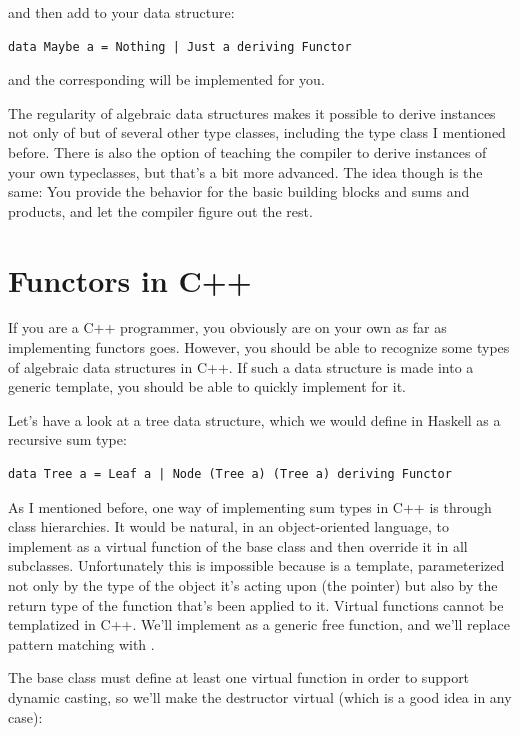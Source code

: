 and then add  to your data structure:

\begin{verbatim}
data Maybe a = Nothing | Just a deriving Functor
\end{verbatim}

and the corresponding  will be implemented for you.

The regularity of algebraic data structures makes it possible to derive
instances not only of  but of several other type
classes, including the  type class I mentioned before. There
is also the option of teaching the compiler to derive instances of your
own typeclasses, but that's a bit more advanced. The idea though is the
same: You provide the behavior for the basic building blocks and sums
and products, and let the compiler figure out the rest.

\section{Functors in C++}\label{functors-in-c}

If you are a C++ programmer, you obviously are on your own as far as
implementing functors goes. However, you should be able to recognize
some types of algebraic data structures in C++. If such a data structure
is made into a generic template, you should be able to quickly implement
 for it.

Let's have a look at a tree data structure, which we would define in
Haskell as a recursive sum type:

\begin{verbatim}
data Tree a = Leaf a | Node (Tree a) (Tree a) deriving Functor
\end{verbatim}

As I mentioned before, one way of implementing sum types in C++ is
through class hierarchies. It would be natural, in an object-oriented
language, to implement  as a virtual function of the base
class  and then override it in all subclasses.
Unfortunately this is impossible because  is a template,
parameterized not only by the type of the object it's acting upon (the
 pointer) but also by the return type of the function
that's been applied to it. Virtual functions cannot be templatized in
C++. We'll implement  as a generic free function, and we'll
replace pattern matching with .

The base class must define at least one virtual function in order to
support dynamic casting, so we'll make the destructor virtual (which is
a good idea in any case):

